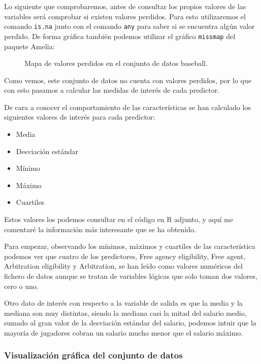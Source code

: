 Lo siguiente que comprobaremos, antes de consultar los propios valores de las variables será comprobar si existen valores perdidos. Para esto utilizaremos el comando \texttt{is.na} junto con el comando \texttt{any} para saber si se encuentra algún valor perdido. De forma gráfica también podemos utilizar el gráfico \texttt{missmap} del paquete Amelia:

\begin{figure}[H]
	\centering
	
	\caption{Mapa de valores perdidos en el conjunto de datos baseball.}
	\label{fig:missmap_baseball}
\end{figure}

Como vemos, este conjunto de datos no cuenta con valores perdidos, por lo que con esto pasamos a calcular las medidas de interés de cada predictor.


De cara a conocer el comportamiento de las características se han calculado los siguientes valores de interés para cada predictor:

\begin{itemize}
	\item Media
	\item Desviación estándar
	\item Mínimo
	\item Máximo
	\item Cuartiles
\end{itemize}


Estos valores los podemos consultar en el código en R adjunto, y aquí me comentaré la información más interesante que se ha obtenido.

Para empezar, observando los mínimos, máximos y cuartiles de las característica podemos ver que cuatro de los predictores, Free agency eligibility, Free agent, Arbitration eligibility y Arbitration, se han leído como valores numéricos del fichero de datos aunque se tratan de variables lógicas que solo toman dos valores, cero o uno.

Otro dato de interés con respecto a la variable de salida es que la media y la mediana son muy distintas, siendo la mediana casi la mitad del salario medio, sumado al gran valor de la desviación estándar del salario, podemos intuir que la mayoría de jugadores cobran un salario mucho menor que el salario máximo.

\subsubsection{Visualización gráfica del conjunto de datos}

